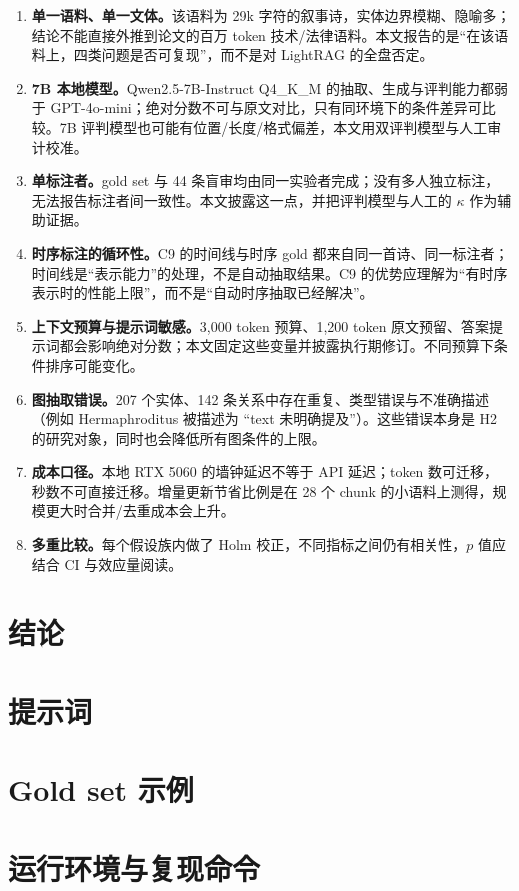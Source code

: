 \documentclass[11pt,a4paper]{ctexart}
\begin{document}
\begin{enumerate}
\item \textbf{单一语料、单一文体。}该语料为 29k 字符的叙事诗，实体边界模糊、隐喻多；结论不能直接外推到论文的百万 token 技术/法律语料。本文报告的是“在该语料上，四类问题是否可复现”，而不是对 LightRAG 的全盘否定。
\item \textbf{7B 本地模型。}Qwen2.5-7B-Instruct Q4\_K\_M 的抽取、生成与评判能力都弱于 GPT-4o-mini；绝对分数不可与原文对比，只有同环境下的条件差异可比较。7B 评判模型也可能有位置/长度/格式偏差，本文用双评判模型与人工审计校准。
\item \textbf{单标注者。}gold set 与 44 条盲审均由同一实验者完成；没有多人独立标注，无法报告标注者间一致性。本文披露这一点，并把评判模型与人工的 $\kappa$ 作为辅助证据。
\item \textbf{时序标注的循环性。}C9 的时间线与时序 gold 都来自同一首诗、同一标注者；时间线是“表示能力”的处理，不是自动抽取结果。C9 的优势应理解为“有时序表示时的性能上限”，而不是“自动时序抽取已经解决”。
\item \textbf{上下文预算与提示词敏感。}3,000 token 预算、1,200 token 原文预留、答案提示词都会影响绝对分数；本文固定这些变量并披露执行期修订。不同预算下条件排序可能变化。
\item \textbf{图抽取错误。}207 个实体、142 条关系中存在重复、类型错误与不准确描述（例如 Hermaphroditus 被描述为 “text 未明确提及”）。这些错误本身是 H2 的研究对象，同时也会降低所有图条件的上限。
\item \textbf{成本口径。}本地 RTX 5060 的墙钟延迟不等于 API 延迟；token 数可迁移，秒数不可直接迁移。增量更新节省比例是在 28 个 chunk 的小语料上测得，规模更大时合并/去重成本会上升。
\item \textbf{多重比较。}每个假设族内做了 Holm 校正，不同指标之间仍有相关性，$p$ 值应结合 CI 与效应量阅读。
\end{enumerate}

\section{结论}
\label{sec:conclusion}





\appendix
\section{提示词}
\label{app:prompts}


\section{Gold set 示例}
\label{app:gold}


\section{运行环境与复现命令}
\label{app:repro}

\end{document}
